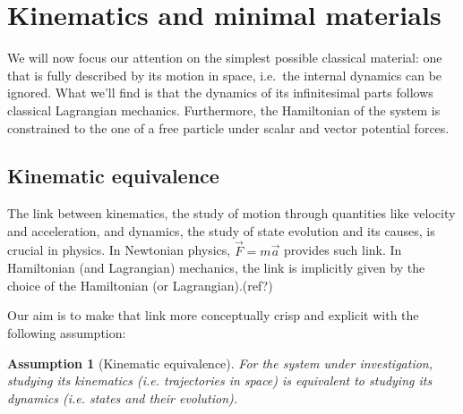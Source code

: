\documentclass[smallextended]{svjour3}
\numberwithin{equation}{section}
\newtheorem{assump}{Assumption}
\theoremstyle{definition}
\begin{document}
\section{Kinematics and minimal materials}
\label{sec:Lagrangian}

We will now focus our attention on the simplest possible classical material: one that is fully described by its motion in space, i.e.~the internal dynamics can be ignored. What we'll find is that the dynamics of its infinitesimal parts follows classical Lagrangian mechanics. Furthermore, the Hamiltonian of the system is constrained to the one of a free particle under scalar and vector potential forces.

\subsection{Kinematic equivalence}

The link between kinematics, the study of motion through quantities like velocity and acceleration, and dynamics, the study of state evolution and its causes, is crucial in physics. In Newtonian physics, $\vec{F}=m\vec{a}$ provides such link. In Hamiltonian (and Lagrangian) mechanics, the link is implicitly given by the choice of the Hamiltonian (or Lagrangian).(ref?)

Our aim is to make that link more conceptually crisp and explicit with the following assumption:

\begin{assump}[Kinematic equivalence]\label{ass:kinematic_equivalence}
	For the system under investigation, studying its kinematics  (i.e. trajectories in space) is equivalent to studying its dynamics  (i.e. states and their evolution).
\end{assump}
\end{document}
